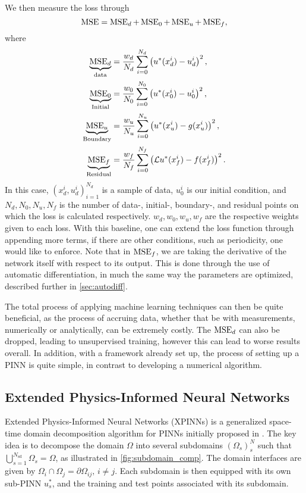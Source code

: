 We then measure the loss through
\begin{equation}\label{eq:PINNMSE}
    \operatorname{MSE} = \operatorname{MSE}_d + \operatorname{MSE}_0 + \operatorname{MSE}_u + \operatorname{MSE}_f,
\end{equation}
where
\begin{equation*}
\begin{split}
    \underbrace{\operatorname{MSE}_d}_{\text{data}} &= \frac{w_d}{N_d} \sum_{i = 0}^{N_d} \left( u^*(x_d^i) - u_d^i \right)^2,  \\
    \underbrace{\operatorname{MSE}_0}_{\text{Initial}} &= \frac{w_0}{N_0} \sum_{i = 0}^{N_0} \left( u^*(x_0^i) - u_0^i \right)^2,  \\
    \underbrace{\operatorname{MSE}_u}_{\text{Boundary}} &= \frac{w_u}{N_u} \sum_{i = 0}^{N_u} \left( u^*(x_u^i) - g(x_u^i) \right)^2, \\
    \underbrace{\operatorname{MSE}_f}_{\text{Residual}} &= \frac{w_f}{N_f} \sum_{i = 0}^{N_f} \left( \mathcal{L}u^*(x_f^i) - f(x_f^i) \right)^2.
\end{split}
\end{equation*}
In this case, $(x_d^i,u_d^i)_{i=1}^{N_d}$ is a sample of data, $u_0^i$ is our initial condition, and $N_d,N_0,N_u,N_f$ is the number of data-, initial-, boundary-, and residual points on which the loss is calculated respectively. $w_d,w_0,w_u,w_f$ are the respective weights given to each loss. 
With this baseline, one can extend the loss function through appending more terms, if there are other conditions, such as periodicity, one would like to enforce.
Note that in $\operatorname{MSE}_f$, we are taking the derivative of the network itself with respect to its output.
This is done through the use of automatic differentiation, in much the same way the parameters are optimized, described further in \autoref{sec:autodiff}.


The total process of applying machine learning techniques can then be quite beneficial, as the process of accruing data, whether that be with measurements, numerically or analytically, can be extremely costly.
The $\operatorname{MSE}_d$ can also be dropped, leading to unsupervised training, however this can lead to worse results overall.
In addition, with a framework already set up, the process of setting up a PINN is quite simple, in contrast to developing a numerical algorithm.

\subsection{Extended Physics-Informed Neural Networks}
Extended Physics-Informed Neural Networks (XPINNs) is a generalized space-time domain decomposition algorithm for PINNs initially proposed in \textcite{Jagtap2020ExtendedPN}.
The key idea is to decompose the domain $\Omega$ into several subdomains $(\Omega_s)_s^N$ such that $\bigcup_{s=1}^{N_\mathrm{sd}}\Omega_s=\Omega$, as illustrated in \autoref{fig:subdomain_comp}.
The domain interfaces are given by $\Omega_i\cap \Omega_j = \partial\Omega_{ij},\, i\neq j$.
Each subdomain is then equipped with its own sub-PINN $u^*_s$, and the training and test points associated with its subdomain.

